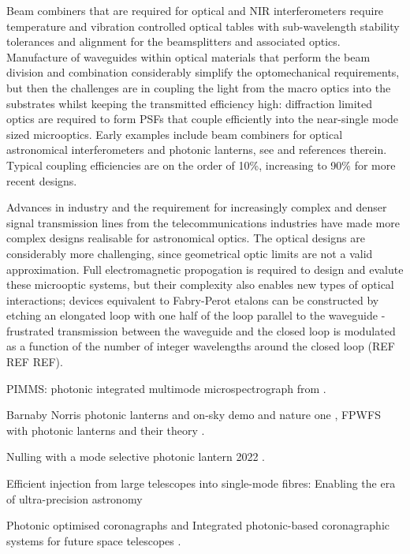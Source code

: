 \documentclass[letterpaper]{ar-1col}
\begin{document}
Beam combiners that are required for optical and NIR interferometers require temperature and vibration controlled optical tables with sub-wavelength stability tolerances and alignment for the beamsplitters and associated optics.
%
Manufacture of waveguides within optical materials that perform the beam division and combination considerably simplify the optomechanical requirements, but then the challenges are in coupling the light from the macro optics into the substrates whilst keeping the transmitted efficiency high: diffraction limited optics are required to form PSFs that couple efficiently into the near-single mode sized microoptics.
%
Early examples include beam combiners for optical astronomical interferometers \citep[for example the IOTA/IONIC beam combiner; ][]{Berger01} and photonic lanterns, see \citet{Leon-Saval10} and references therein.
%
Typical coupling efficiencies are on the order of 10\%, increasing to 90\% for more recent designs.

Advances in industry and the requirement for increasingly complex and denser signal transmission lines from the telecommunications industries have made more complex designs realisable for astronomical optics.
%
The optical designs are considerably more challenging, since geometrical optic limits are not a valid approximation.
%
Full electromagnetic propogation is required to design and evalute these microoptic systems, but their complexity also enables new types of optical interactions; devices equivalent to Fabry-Perot etalons can be constructed by etching an elongated loop with one half of the loop parallel to the waveguide - frustrated transmission between the waveguide and the closed loop is modulated as a function of the number of integer wavelengths around the closed loop (REF REF REF).

PIMMS: photonic integrated multimode microspectrograph from \citet{Bland-Hawthorn10}.

Barnaby Norris photonic lanterns \citep{Norris22} and on-sky demo \citep{Norris20} and nature one \cite{Norris20a}, FPWFS with photonic lanterns \citep{Lin20} and their theory \citep{Lin22}.

Nulling with a mode selective photonic lantern 2022 \citep{Xin22}.

Efficient injection from large telescopes into single-mode fibres: Enabling the era of ultra-precision astronomy \citep{Jovanovic17}

Photonic optimised coronagraphs and Integrated photonic-based coronagraphic systems for future space telescopes
 \citep{Desai23a}.
\end{document}
